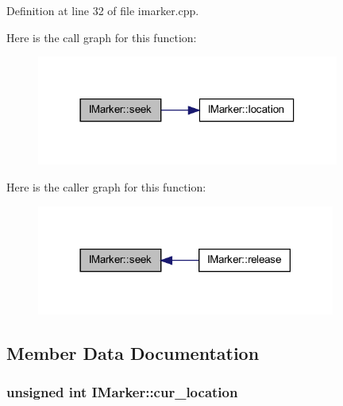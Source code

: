 Definition at line 32 of file imarker.cpp.



Here is the call graph for this function:\nopagebreak
\begin{figure}[H]
\begin{center}
\leavevmode
\includegraphics[width=282pt]{class_i_marker_a58086bbf091c5b49c15464a070fec171_cgraph}
\end{center}
\end{figure}




Here is the caller graph for this function:\nopagebreak
\begin{figure}[H]
\begin{center}
\leavevmode
\includegraphics[width=278pt]{class_i_marker_a58086bbf091c5b49c15464a070fec171_icgraph}
\end{center}
\end{figure}




\subsection{Member Data Documentation}
\hypertarget{class_i_marker_adedaefcf6a1b1eac3d728a9d318dc618}{
\subsubsection[{cur\_\-location}]{\setlength{\rightskip}{0pt plus 5cm}unsigned int {\bf IMarker::cur\_\-location}}}
\label{class_i_marker_adedaefcf6a1b1eac3d728a9d318dc618}


